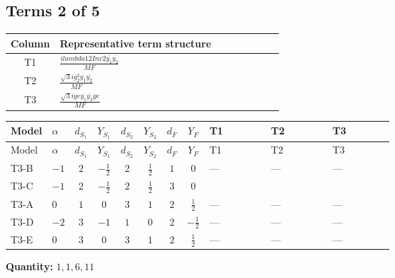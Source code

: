 \documentclass[8pt]{article}
\begin{document}
\begin{landscape}
\subsection*{Terms 2 of 5}
\begin{center}
\begin{tabular}{@{}c >{\raggedright\arraybackslash}p{0.82\linewidth}@{}}
\toprule
Column & Representative term structure \\
\midrule
T1 & \(\displaystyle \frac{i lambda12Inv2 \overline{y_{1}} \overline{y_{2}}}{MF}\) \\
\midrule
T2 & \(\displaystyle \frac{\sqrt{3} i g_{2}^{2} \overline{y_{1}} \overline{y_{2}}}{MF}\) \\
\midrule
T3 & \(\displaystyle \frac{\sqrt{3} i ye \overline{y_{1}} \overline{y_{2}} \overline{ye}}{MF}\) \\
\midrule
\bottomrule
\end{tabular}
\end{center}
\smallskip
\tiny
\begin{longtable}{@{}llcccccc >{\raggedright\arraybackslash}p{0.21\linewidth} >{\raggedright\arraybackslash}p{0.21\linewidth} >{\raggedright\arraybackslash}p{0.21\linewidth}@{}}
\toprule
Model & $\alpha$ & $d_{S_1}$ & $Y_{S_1}$ & $d_{S_2}$ & $Y_{S_2}$ & $d_F$ & $Y_F$ & T1 & T2 & T3 \\
\midrule
\endfirsthead
\toprule
Model & $\alpha$ & $d_{S_1}$ & $Y_{S_1}$ & $d_{S_2}$ & $Y_{S_2}$ & $d_F$ & $Y_F$ & T1 & T2 & T3 \\
\midrule
\endhead
T3-B & $-1$ & $2$ & $-\frac{1}{2}$ & $2$ & $\frac{1}{2}$ & $1$ & $0$ & --- & --- & --- \\
\midrule
T3-C & $-1$ & $2$ & $-\frac{1}{2}$ & $2$ & $\frac{1}{2}$ & $3$ & $0$ & \scriptsize\adjustbox{max width=\linewidth}{$\begin{gathered} - \frac{i lambda12Inv2 \overline{y_{1}} \overline{y_{2}}}{3 MF}\end{gathered}$} & \scriptsize\adjustbox{max width=\linewidth}{$\begin{gathered} - \frac{\sqrt{3} i g_{2}^{2} \overline{y_{1}} \overline{y_{2}}}{4 MF}\end{gathered}$} & \scriptsize\adjustbox{max width=\linewidth}{$\begin{gathered} \frac{\sqrt{3} i ye \overline{y_{1}} \overline{y_{2}} \overline{ye}}{12 MF}\end{gathered}$} \\
\midrule
T3-A & $0$ & $1$ & $0$ & $3$ & $1$ & $2$ & $\frac{1}{2}$ & --- & --- & --- \\
\midrule
T3-D & $-2$ & $3$ & $-1$ & $1$ & $0$ & $2$ & $-\frac{1}{2}$ & --- & --- & --- \\
\midrule
T3-E & $0$ & $3$ & $0$ & $3$ & $1$ & $2$ & $\frac{1}{2}$ & --- & --- & --- \\
\midrule
\bottomrule
\end{longtable}
\clearpage
\noindent\textbf{Quantity: }$\mathrm{1,1,6,11}$\par\smallskip

\end{landscape}
\end{document}
